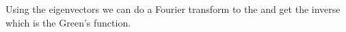 Using the eigenvectors we can do a Fourier transform to the
{\jacobianOrb} and get the inverse which is the Green's function.

